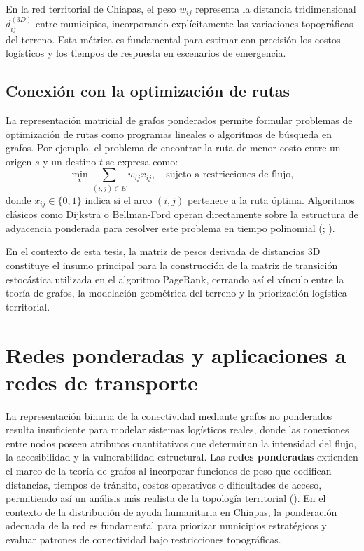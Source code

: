 \documentclass[
  spanish,
  us-letterpaper,
]{scrreprt}
\numberwithin{equation}{section}
\begin{document}
En la red territorial de Chiapas, el peso \(w_{ij}\) representa la
distancia tridimensional \(d_{ij}^{(3D)}\) entre municipios,
incorporando explícitamente las variaciones topográficas del terreno.
Esta métrica es fundamental para estimar con precisión los costos
logísticos y los tiempos de respuesta en escenarios de emergencia.

\subsection{Conexión con la optimización de
rutas}\label{conexiuxf3n-con-la-optimizaciuxf3n-de-rutas}

La representación matricial de grafos ponderados permite formular
problemas de optimización de rutas como programas lineales o algoritmos
de búsqueda en grafos. Por ejemplo, el problema de encontrar la ruta de
menor costo entre un origen \(s\) y un destino \(t\) se expresa como: \[
\min_{\mathbf{x}} \sum_{(i,j) \in E} w_{ij} x_{ij}, \quad \text{sujeto a restricciones de flujo},
\] donde \(x_{ij} \in \{0,1\}\) indica si el arco \((i,j)\) pertenece a
la ruta óptima. Algoritmos clásicos como Dijkstra o Bellman-Ford operan
directamente sobre la estructura de adyacencia ponderada para resolver
este problema en tiempo polinomial
(;
).

En el contexto de esta tesis, la matriz de pesos derivada de distancias
3D constituye el insumo principal para la construcción de la matriz de
transición estocástica utilizada en el algoritmo PageRank, cerrando así
el vínculo entre la teoría de grafos, la modelación geométrica del
terreno y la priorización logística territorial.

\section{Redes ponderadas y aplicaciones a redes de
transporte}\label{redes-ponderadas-y-aplicaciones-a-redes-de-transporte}

La representación binaria de la conectividad mediante grafos no
ponderados resulta insuficiente para modelar sistemas logísticos reales,
donde las conexiones entre nodos poseen atributos cuantitativos que
determinan la intensidad del flujo, la accesibilidad y la vulnerabilidad
estructural. Las \textbf{redes ponderadas} extienden el marco de la
teoría de grafos al incorporar funciones de peso que codifican
distancias, tiempos de tránsito, costos operativos o dificultades de
acceso, permitiendo así un análisis más realista de la topología
territorial (). En el
contexto de la distribución de ayuda humanitaria en Chiapas, la
ponderación adecuada de la red es fundamental para priorizar municipios
estratégicos y evaluar patrones de conectividad bajo restricciones
topográficas.
\end{document}
